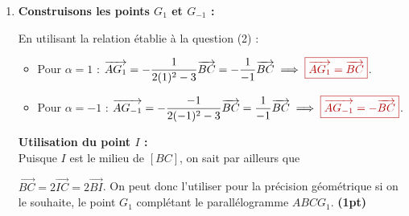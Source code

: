 \documentclass[12pt,a4paper]{article}
\newcommand{\redtitle}[1]{\textcolor{myred}{\textbf{#1}}}
\newcommand{\redbox}[1]{\color{myred}\boxed{#1}\color{black}}
\begin{document}
\begin{enumerate}
    \item \redtitle{Construisons les points $G_1$ et $G_{-1}$ :}
    
    En utilisant la relation établie à la question (2) :
    \begin{itemize}
        \item Pour $\alpha = 1$ : $\overrightarrow{AG_1} = -\dfrac{1}{2(1)^2 - 3}\overrightarrow{BC} = -\dfrac{1}{-1}\overrightarrow{BC} \implies \redbox{\overrightarrow{AG_1} = \overrightarrow{BC}}$.
        \item Pour $\alpha = -1$ : $\overrightarrow{AG_{-1}} = -\dfrac{-1}{2(-1)^2 - 3}\overrightarrow{BC} = \dfrac{1}{-1}\overrightarrow{BC} \implies \redbox{\overrightarrow{AG_{-1}} = -\overrightarrow{BC}}$.
    \end{itemize}
    \textbf{Utilisation du point $I$ :} \\
    Puisque $I$ est le milieu de $[BC]$, on sait par ailleurs que
    
     $\overrightarrow{BC} = 2\overrightarrow{IC} = 2\overrightarrow{BI}$. On peut donc l'utiliser pour la précision géométrique si on le souhaite, le point $G_1$ complétant le parallélogramme $ABCG_1$. \hfill \textbf{(1pt)}

\begin{center}
\end{center}
\end{enumerate}
\end{document}
